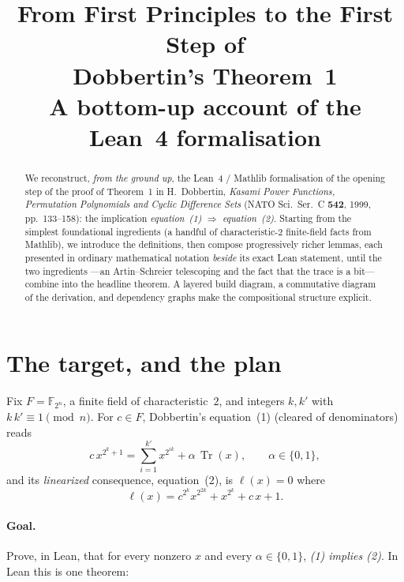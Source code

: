 \documentclass[11pt]{article}
\title{\bfseries From First Principles to the First Step of\\
  Dobbertin's Theorem~1\\[4pt]
  \large A bottom-up account of the \lc{DobbertinStep1} Lean~4 formalisation}
\author{}
\date{}
\newcommand{\Tr}{\operatorname{Tr}}
\begin{document}
\maketitle

\begin{abstract}
We reconstruct, \emph{from the ground up}, the Lean~4 / Mathlib formalisation of
the opening step of the proof of Theorem~1 in H.~Dobbertin, \emph{Kasami Power
Functions, Permutation Polynomials and Cyclic Difference Sets} (NATO Sci.\ Ser.\
C \textbf{542}, 1999, pp.~133--158): the implication \emph{equation~(1)}
$\Rightarrow$ \emph{equation~(2)}.  Starting from the simplest foundational
ingredients (a handful of characteristic-$2$ finite-field facts from Mathlib),
we introduce the definitions, then compose progressively richer lemmas, each
presented in ordinary mathematical notation \emph{beside} its exact Lean
statement, until the two ingredients ---an Artin--Schreier telescoping and the
fact that the trace is a bit--- combine into the headline theorem.  A layered
build diagram, a commutative diagram of the derivation, and dependency graphs
make the compositional structure explicit.
\end{abstract}

\tableofcontents

\section{The target, and the plan}
Fix $F=\mathbb{F}_{2^n}$, a finite field of characteristic~$2$, and integers
$k,k'$ with $k\,k'\equiv 1\pmod n$.  For $c\in F$, Dobbertin's equation~(1)
(cleared of denominators) reads
\begin{equation}
  c\,x^{2^k+1}=\sum_{i=1}^{k'}x^{2^{ik}}+\alpha\,\Tr(x),\qquad \alpha\in\{0,1\},
  \tag{1}
\end{equation}
and its \emph{linearized} consequence, equation~(2), is $\ell(x)=0$ where
\begin{equation}
  \ell(x)=c^{2^k}x^{2^{2k}}+x^{2^k}+c\,x+1 .
  \tag{2}
\end{equation}

\paragraph{Goal.}  Prove, in Lean, that for every nonzero $x$ and every
$\alpha\in\{0,1\}$, \emph{(1) implies (2)}.  In Lean this is one theorem:
\end{document}
